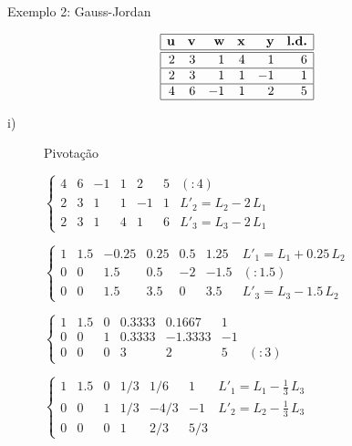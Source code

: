 Exemplo 2: Gauss-Jordan

\[
 \begin{array}{|rrrrrr|}
	\hline
	\textbf{u} & \textbf{v} & \textbf{w} & \textbf{x} & \textbf{y} & \textbf{l.d.}\\
	\hline \hline
	2 & 3 & 1 & 4 & 1 & 6\\
	\hline
	2 & 3 & 1 & 1 & -1 & 1\\
	\hline
	4 & 6 & -1 & 1 & 2 & 5\\
	\hline
 \end{array}
\]

\begin{description}

\item[i)] Pivotação

\hspace*{2 cm}
$
 \left\{
  \begin{array}{rrrrrr|l}
   4 & 6 & -1 & 1 & 2 & 5 & (: 4)\\
   2 & 3 & 1 & 1 & -1 & 1 & L'_2 = L_2 - 2 \, L_1\\
   2 & 3 & 1 & 4 & 1 & 6 & L'_3 = L_3 - 2 \, L_1
  \end{array}
 \right.
$

\hspace*{2 cm}
$
 \left\{
  \begin{array}{rrrrrr|l}
   1 & 1.5 & -0.25 & 0.25 & 0.5 & 1.25 & L'_1 = L_1 + 0.25 \, L_2\\
   0 & 0 & 1.5 & 0.5 & -2 & -1.5 & (: 1.5)\\
   0 & 0 & 1.5 & 3.5 & 0 & 3.5 & L'_3 = L_3 - 1.5 \, L_2
  \end{array}
 \right.
$

\hspace*{2 cm}
$
 \left\{
  \begin{array}{rrrrrr|l}
   1 & 1.5 & 0 & 0.3333 & 0.1667 & 1 &\\
   0 & 0 & 1 & 0.3333 & -1.3333 & -1 &\\
   0 & 0 & 0 & 3 & 2 & 5 & (: 3)
  \end{array}
 \right.
$

\hspace*{2 cm}
$
 \left\{
  \begin{array}{rrrrrr|l}
   1 & 1.5 & 0 & 1/3 & 1/6 & 1 & L'_1 = L_1 - \frac{1}{3} \, L_3\\
   0 & 0 & 1 & 1/3 & -4/3 & -1 & L'_2 = L_2 - \frac{1}{3} \, L_3\\
   0 & 0 & 0 & 1 & 2/3 & 5/3 &
  \end{array}
 \right.
$

\end{description}

